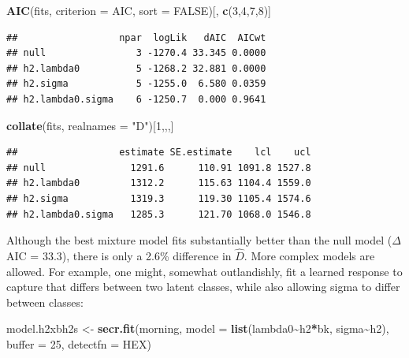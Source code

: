 \documentclass[
]{book}
\newenvironment{Shaded}{\begin{snugshade}}{\end{snugshade}}
\newcommand{\AttributeTok}[1]{\textcolor[rgb]{0.13,0.29,0.53}{#1}}
\newcommand{\ConstantTok}[1]{\textcolor[rgb]{0.56,0.35,0.01}{#1}}
\newcommand{\DecValTok}[1]{\textcolor[rgb]{0.00,0.00,0.81}{#1}}
\newcommand{\FunctionTok}[1]{\textcolor[rgb]{0.13,0.29,0.53}{\textbf{#1}}}
\newcommand{\NormalTok}[1]{#1}
\newcommand{\OtherTok}[1]{\textcolor[rgb]{0.56,0.35,0.01}{#1}}
\newcommand{\SpecialCharTok}[1]{\textcolor[rgb]{0.81,0.36,0.00}{\textbf{#1}}}
\newcommand{\StringTok}[1]{\textcolor[rgb]{0.31,0.60,0.02}{#1}}
\begin{document}
\begin{Shaded}
\begin{Highlighting}[]
\FunctionTok{AIC}\NormalTok{(fits, }\AttributeTok{criterion =} \StringTok{\textquotesingle{}AIC\textquotesingle{}}\NormalTok{, }\AttributeTok{sort =} \ConstantTok{FALSE}\NormalTok{)[, }\FunctionTok{c}\NormalTok{(}\DecValTok{3}\NormalTok{,}\DecValTok{4}\NormalTok{,}\DecValTok{7}\NormalTok{,}\DecValTok{8}\NormalTok{)]}
\end{Highlighting}
\end{Shaded}

\begin{verbatim}
##                  npar  logLik   dAIC  AICwt
## null                3 -1270.4 33.345 0.0000
## h2.lambda0          5 -1268.2 32.881 0.0000
## h2.sigma            5 -1255.0  6.580 0.0359
## h2.lambda0.sigma    6 -1250.7  0.000 0.9641
\end{verbatim}

\begin{Shaded}
\begin{Highlighting}[]
\FunctionTok{collate}\NormalTok{(fits, }\AttributeTok{realnames =} \StringTok{"D"}\NormalTok{)[}\DecValTok{1}\NormalTok{,,,]}
\end{Highlighting}
\end{Shaded}

\begin{verbatim}
##                  estimate SE.estimate    lcl    ucl
## null               1291.6      110.91 1091.8 1527.8
## h2.lambda0         1312.2      115.63 1104.4 1559.0
## h2.sigma           1319.3      119.30 1105.4 1574.6
## h2.lambda0.sigma   1285.3      121.70 1068.0 1546.8
\end{verbatim}

Although the best mixture model fits substantially better than the null model (\(\Delta\)AIC = 33.3), there is only a
2.6\% difference in \(\hat D\).
More complex models are allowed. For example, one might, somewhat outlandishly, fit a learned response to capture that differs between two latent classes, while also allowing sigma to differ between classes:

\begin{Shaded}
\begin{Highlighting}[]
\NormalTok{model.h2xbh2s }\OtherTok{\textless{}{-}} \FunctionTok{secr.fit}\NormalTok{(morning, }\AttributeTok{model =} \FunctionTok{list}\NormalTok{(lambda0}\SpecialCharTok{\textasciitilde{}}\NormalTok{h2}\SpecialCharTok{*}\NormalTok{bk, }
\NormalTok{    sigma}\SpecialCharTok{\textasciitilde{}}\NormalTok{h2), }\AttributeTok{buffer =} \DecValTok{25}\NormalTok{, }\AttributeTok{detectfn =} \StringTok{\textquotesingle{}HEX\textquotesingle{}}\NormalTok{)}
\end{Highlighting}
\end{Shaded}
\end{document}
